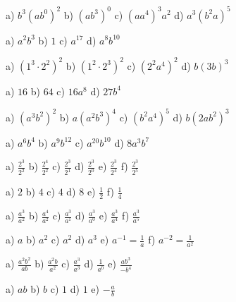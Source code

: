 \begin{tehtava}
a) $b^3(ab^0)^2$ \qquad b) $(ab^3)^0$ \qquad c) $(aa^4)^3a^2$ \qquad d) $a^3(b^2a)^5$
\begin{vastaus}
a) $a^2b^3$ \qquad b) $1$ \qquad c) $a^{17}$ \qquad d) $a^8b^{10}$
\end{vastaus}
\end{tehtava}
\begin{tehtava}
a) $(1^3\cdot 2^2)^2$ \qquad b) $(1^2\cdot 2^3)^2$ \qquad c) $(2^2a^4)^2$ \qquad d) $b(3b)^3$
\begin{vastaus}
a) $16$ \qquad b) $64$ \qquad c) $16a^8$ \qquad d) $27b^4$
\end{vastaus}
\end{tehtava}
\begin{tehtava}
a) $(a^3b^2)^2$ \qquad b) $a(a^2b^3)^4$ \qquad c) $(b^2a^4)^5$ \qquad d) $b(2ab^2)^3$
\begin{vastaus}
a) $a^6b^4$ \qquad b) $a^9b^{12}$ \qquad c) $a^{20}b^{10}$ \qquad d) $8a^3b^7$
\end{vastaus}
\end{tehtava}
\begin{tehtava}
a) $\frac{2^3}{2^2}$ \qquad b) $\frac{2^4}{2^2}$ \qquad c) $\frac{2^3}{2^1}$ \qquad d) $\frac{2^3}{2^0}$ \qquad e) $\frac{2^3}{2^4}$
\qquad f) $\frac{2^3}{2^5}$
\begin{vastaus}
a) $2$ \qquad b) $4$ \qquad c) $4$ \qquad d) $8$ \qquad e) $\frac{1}{2}$ \qquad f) $\frac{1}{4}$
\end{vastaus}
\end{tehtava}
\begin{tehtava}
a) $\frac{a^3}{a^2}$ \qquad b) $\frac{a^4}{a^2}$ \qquad c) $\frac{a^3}{a^1}$ \qquad d) $\frac{a^3}{a^0}$ \qquad e) $\frac{a^3}{a^4}$
\qquad f) $\frac{a^3}{a^5}$
\begin{vastaus}
a) $a$ \qquad b) $a^2$ \qquad c) $a^2$ \qquad d) $a^3$ \qquad e) $a^{-1} = \frac{1}{a}$ \qquad f) $a^{-2} = \frac{1}{a^2}$
\end{vastaus}
\end{tehtava}
\begin{tehtava}
a) $\frac{a^2b^2}{ab}$ \qquad b) $\frac{a^2b}{a^2}$ \qquad c) $\frac{a^3}{a^3}$ \qquad d) $\frac{1}{a^0}$ \qquad e) $\frac{ab^3}{-b^4}$
\begin{vastaus}
a) $ab$ \qquad b) $b$ \qquad c) $1$ \qquad d) $1$ \qquad e) $-\frac{a}{b}$
\end{vastaus}
\end{tehtava}
